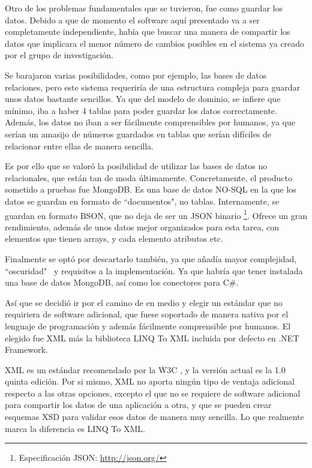 Otro de los problemas fundamentales que se tuvieron, fue como guardar los datos. Debido a que de momento el software
aqu\'i presentado va a ser completamente independiente, hab\'ia que buscar una manera de compartir los datos
que implicara el menor n\'umero de cambios posibles en el sistema ya creado por el grupo de investigaci\'on.

Se barajaron varias posibilidades, como por ejemplo, las bases de datos relaciones, pero este sistema requerir\'ia
de una estructura compleja para guardar unos datos bastante sencillos. Ya que del modelo de dominio, se infiere que m\'inimo,
iba a haber 4 tablas para poder guardar los datos correctamente. Adem\'as, los datos no iban a ser f\'acilmente 
comprensibles por humanos, ya que ser\'ian un amasijo de n\'umeros guardados en tablas que ser\'ian dif\'iciles de
relacionar entre ellas de manera sencilla.

Es por ello que se valor\'o la posibilidad de utilizar las bases de datos no relacionales, que est\'an tan de moda
\'ultimamente. Concretamente, el producto sometido a pruebas fue MongoDB. Es una base de datos NO-SQL en la que los
datos se guardan en formato de ``documentos", no tablas. Internamente, se guardan en formato BSON, que no deja de ser
un JSON binario \footnote{Especificaci\'{o}n JSON: \url{http://json.org/}}. Ofrece un gran rendimiento, adem\'as
de unos datos mejor organizados para esta tarea, con elementos que tienen arrays, y cada elemento atributos etc.

Finalmente se opt\'o por descartarlo tambi\'en, ya que a\~nad\'ia mayor complejidad, ``oscuridad" \ y requisitos a la 
implementaci\'on. Ya que habr\'ia que tener instalada una base de datos MongoDB, as\'i como los conectores para
C\#.

As\'i que se decidi\'o ir por el camino de en medio y elegir un est\'andar que no requiriera de software adicional,
que fuese soportado de manera nativa por el lenguaje de programaci\'on y adem\'as f\'acilmente comprensible por
humanos. El elegido fue XML m\'as la biblioteca LINQ To XML incluida por defecto en .NET Framework. 

XML es un est\'andar recomendado por la W3C \cite{XML:Specification}, y la versi\'on actual es la 1.0 quinta edici\'on.
Por si mismo, XML no aporta ning\'un tipo de ventaja adicional respecto a las otras opciones, excepto el que no se
requiere de software adicional para compartir los datos de una aplicaci\'on a otra, y que
se pueden crear esquemas XSD para validar esos datos de manera muy sencilla. 
Lo que realmente marca
la diferencia es LINQ To XML.

